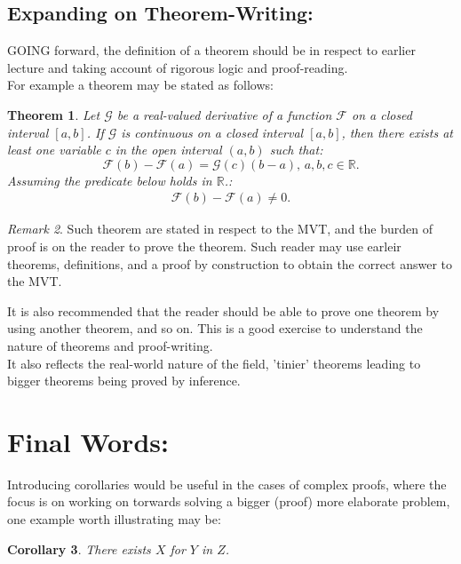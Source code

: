 \documentclass[10pt]{article}
\theoremstyle{plain}
\newtheorem{theorem}{Theorem}[section]
\newtheorem{corollary}[theorem]{Corollary}
\theoremstyle{definition}
\theoremstyle{remark}
\newtheorem{remark}[theorem]{Remark}
\begin{document}
\subsection{Expanding on Theorem-Writing:}

\lettrine[lines=2, lhang=0.1, loversize=0.2]{G}OING forward, the definition of a theorem should be in respect to earlier lecture and taking account of rigorous logic and proof-reading.\\
For example a theorem may be stated as follows:

\begin{theorem}
	Let $\mathcal{G}$ be a real-valued derivative of a function $\mathcal{F}$ on a closed interval $[a, b]$. If $\mathcal{G}$ is continuous on a closed interval $[a, b]$, then there exists at least one variable $c$ in the open interval $(a, b)$ such that:
	\begin{equation}
		\mathcal{F}(b) - \mathcal{F}(a) = \mathcal{G}(c)(b - a), \, a, b, c \in \mathbb{R}.
	\end{equation}
	Assuming the predicate below holds in $\mathbb{R}$.:
	\begin{align*}
	\mathcal{F}(b) - \mathcal{F}(a) \neq 0.
	\end{align*}
\end{theorem}
\begin{remark}
	Such theorem are stated in respect to the MVT, and the burden of proof is on the reader to prove the theorem. Such reader may use earleir theorems, definitions, and a proof by construction to obtain the correct answer to the MVT.
\end{remark}
It is also recommended that the reader should be able to prove one theorem by using another theorem, and so on. This is a good exercise to understand the nature of theorems and proof-writing.\\
It also reflects the real-world nature of the field, 'tinier' theorems leading to bigger theorems being proved by inference. 

\section{Final Words:}

Introducing corollaries would be useful in the cases of complex proofs, where the focus is on working on torwards solving a bigger (proof) more elaborate problem, one example worth illustrating may be:

\begin{corollary}
	There exists $X$ for $Y$ in $Z$.
\end{corollary}
\end{document}
